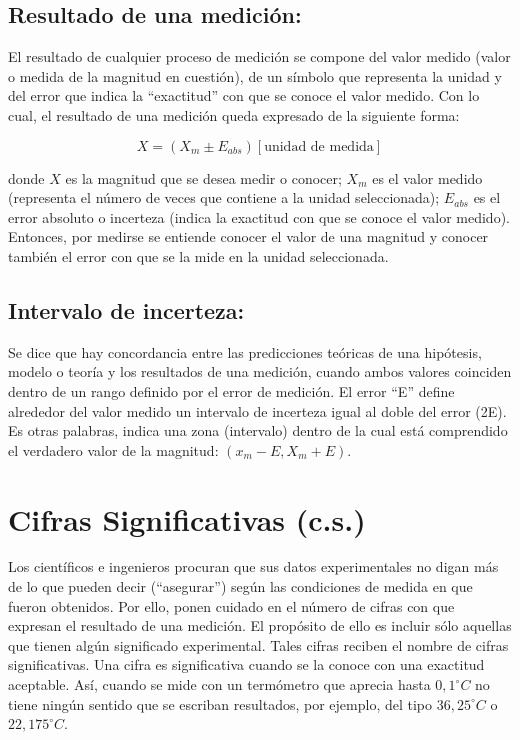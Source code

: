 \subsection{Resultado de una medición:}

El resultado de cualquier proceso de medición se compone del valor medido (valor o medida de la magnitud en cuestión), de un 
símbolo que representa la unidad y del error que indica la ``exactitud'' con que se conoce el valor medido.  Con lo cual, el 
resultado de una medición queda expresado de la siguiente forma:

\begin{equation}
 X = (X_m \pm E_{abs})[\text{unidad de medida}]
\end{equation}

donde $X$ es la  magnitud que se desea medir o conocer; $X_m$  es  el  valor  medido  (representa  el número de veces que 
contiene a la unidad seleccionada); $E_{abs}$ es el error absoluto o incerteza (indica la exactitud con que se conoce el valor 
medido). Entonces, por medirse se entiende conocer el valor de una magnitud y conocer también el error con que se la mide en la 
unidad seleccionada.

\subsection{Intervalo de incerteza:}

Se dice que hay concordancia entre las predicciones teóricas de una hipótesis, modelo o teoría y los resultados de una medición,  
cuando  ambos  valores  coinciden  dentro  de  un  rango  definido  por  el error de medición. El error ``E'' define alrededor 
del valor medido un intervalo de incerteza igual al doble  del  error  (2E). Es otras palabras, indica una zona (intervalo) 
dentro de la cual está comprendido el verdadero valor de la magnitud: $(x_m - E, X_m + E)$.

\section{Cifras Significativas (c.s.)}

Los científicos e ingenieros procuran que sus datos experimentales no digan más de lo que pueden decir  (``asegurar'')  según  
las condiciones de medida en que fueron obtenidos. Por ello, ponen cuidado en el número de cifras con que expresan el resultado  
de una medición. El  propósito  de ello  es  incluir sólo aquellas  que  tienen  algún  significado  experimental. Tales cifras  
reciben  el nombre de cifras significativas.  Una cifra es significativa cuando se la conoce con una exactitud aceptable. Así,  
cuando  se  mide  con  un  termómetro  que  aprecia  hasta  $0,1^\circ C$  no  tiene  ningún sentido que se escriban resultados, 
por ejemplo, del tipo $36,25^\circ C$ o $22,175^\circ C$.\\


